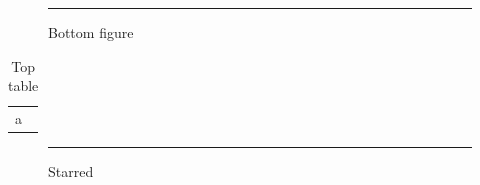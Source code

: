 \documentclass{article}
\begin{document}
\begin{figure}
\rule{1cm}{1cm}
\caption{Bottom figure}
\end{figure}
\begin{table}
\caption{Top table}
\begin{tabular}{l}a\end{tabular}
\end{table}
\begin{figure}
\captionsetup{justification=centering,position=top}
\caption*{Starred}
\rule{1cm}{1cm}
\end{figure}
\end{document}
